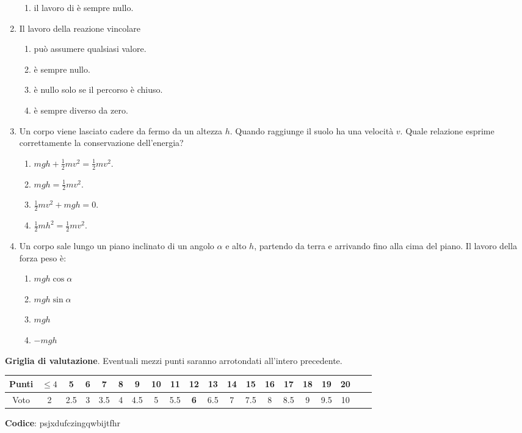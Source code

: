 \documentclass{article}
\begin{document}
\begin{enumerate}
\begin{enumerate}[label=\Alph*.]
    \item il lavoro di  è sempre nullo.
  \end{enumerate}
  \item Il lavoro della reazione vincolare
  \begin{enumerate}[label=\Alph*.]
    \item può assumere qualsiasi valore.
    \item è sempre nullo.
    \item è nullo solo se il percorso è chiuso.
    \item è sempre diverso da zero.
  \end{enumerate}
  \item Un corpo viene lasciato cadere da fermo da un altezza $h$. Quando raggiunge il suolo ha una velocità $v$. Quale relazione esprime correttamente la conservazione dell'energia?
  \begin{enumerate}[label=\Alph*.]
    \item $mgh+\frac{1}{2}mv^2=\frac{1}{2}mv^2.$
    \item $mgh=\frac{1}{2}mv^2$.
    \item $\frac{1}{2}mv^2+mgh=0.$
    \item $\frac{1}{2}mh^2=\frac{1}{2}mv^2$.
  \end{enumerate}
  \item Un corpo sale lungo un piano inclinato di un angolo $\alpha$ e alto $h$, partendo da terra e arrivando fino alla cima del piano. Il lavoro della forza peso è:
  \begin{enumerate}[label=\Alph*.]
    \item $mgh\cos\alpha$
    \item $mgh\sin\alpha$
    \item $mgh$
    \item $-mgh$
  \end{enumerate}
\end{enumerate}








\newpage \maketitle \centering \textbf{Griglia di valutazione}. Eventuali mezzi punti saranno arrotondati all'intero precedente. \begin{table}[h]     \centering \begin{tabular}{|c|c|c|c|c|c|c|c|c|c|c|c|c|c|c|c|c|c|c|c|} \hline Punti &  $\leq 4$ & 5 & 6 & 7 & 8 & 9 & 10 & 11 & \textbf{12} & 13 & 14 & 15 & 16 & 17 & 18 & 19 & 20 \\ \hline Voto & 2 & 2.5 & 3 & 3.5 & 4 & 4.5 & 5 & 5.5 & \textbf{6} & 6.5 & 7 & 7.5 & 8 & 8.5 & 9 & 9.5 & 10 \\ \hline \end{tabular} \end{table}
\textbf{Codice}: psjxdufczingqwbijtfhr
\end{document}
